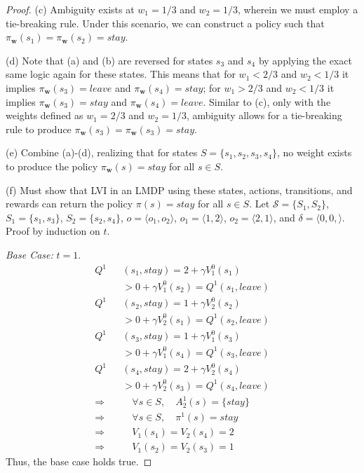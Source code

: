 \begin{proof}
(c) Ambiguity exists at $w_1 = 1/3$ and $w_2 = 1/3$, wherein we must employ a tie-breaking rule. Under this scenario, we can construct a policy such that $\pi_\mathbf{w}(s_1) = \pi_\mathbf{w}(s_2) = stay$.

(d) Note that (a) and (b) are reversed for states $s_3$ and $s_4$ by applying the exact same logic again for these states. This means that for $w_1 < 2/3$ and $w_2 < 1/3$ it implies $\pi_\mathbf{w}(s_3) = leave$ and $\pi_\mathbf{w}(s_4) = stay$; for $w_1 > 2/3$ and $w_2 < 1/3$ it implies $\pi_\mathbf{w}(s_3) = stay$ and $\pi_\mathbf{w}(s_4) = leave$. Similar to (c), only with the weights defined as $w_1 = 2/3$ and $w_2 = 1/3$, ambiguity allows for a tie-breaking rule to produce $\pi_\mathbf{w}(s_3) = \pi_\mathbf{w}(s_3) = stay$.

(e) Combine (a)-(d), realizing that for states $S = \{s_1, s_2, s_3, s_4\}$, no weight exists to produce the policy $\pi_\mathbf{w}(s) = stay$ for all $s \in S$.

(f) Must show that LVI in an LMDP using these states, actions, transitions, and rewards can return the policy $\pi(s) = stay$ for all $s \in S$. Let $\mathcal{S} = \{S_1, S_2\}$, $S_1 = \{s_1, s_3\}$, $S_2 = \{s_2, s_4\}$, $o = \langle o_1, o_2 \rangle$, $o_1 = \langle 1, 2 \rangle$, $o_2 = \langle 2, 1 \rangle$, and $\delta = \langle 0, 0, \rangle$. Proof by induction on $t$.

\emph{Base Case:} $t = 1$.
\begin{align*}
    Q^1&(s_1, stay) = 2 + \gamma V_1^0(s_1) \\
        &> 0 + \gamma V_1^0(s_2) = Q^1(s_1, leave) \\
    Q^1&(s_2, stay) = 1 + \gamma V_2^0(s_2) \\
        &> 0 + \gamma V_2^0(s_1) = Q^1(s_2, leave) \\
    Q^1&(s_3, stay) = 1 + \gamma V_1^0(s_3) \\
        &> 0 + \gamma V_1^0(s_4) = Q^1(s_3, leave) \\
    Q^1&(s_4, stay) = 2 + \gamma V_2^0(s_4) \\
        &> 0 + \gamma V_2^0(s_3) = Q^1(s_4, leave) \\
    \Rightarrow \quad &\quad \forall s \in S, \quad A_2^1(s) = \{stay\} \\
    \Rightarrow \quad &\quad \forall s \in S, \quad \pi^1(s) = stay \\
    \Rightarrow \quad &\quad V_1(s_1) = V_2(s_4) = 2 \\
    \Rightarrow \quad &\quad V_1(s_2) = V_2(s_3) = 1
\end{align*}
Thus, the base case holds true.


\end{proof}
